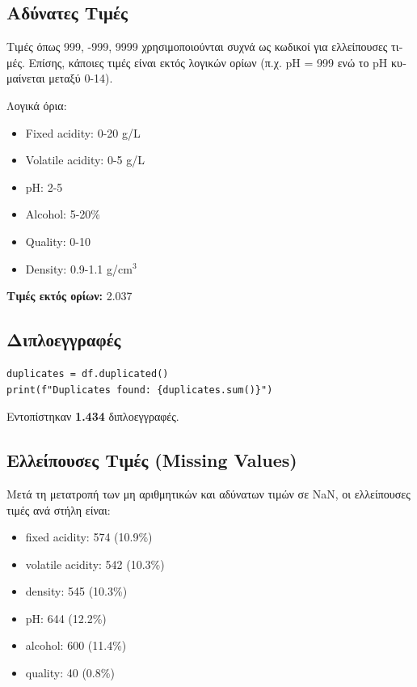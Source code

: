 \documentclass[12pt,a4paper]{article}
\begin{document}
\subsection{\textgreek{Αδύνατες Τιμές}}

\textgreek{Τιμές όπως 999, -999, 9999 χρησιμοποιούνται συχνά ως κωδικοί για ελλείπουσες τιμές. Επίσης, κάποιες τιμές είναι εκτός λογικών ορίων (π.χ. pH = 999 ενώ το pH κυμαίνεται μεταξύ 0-14).}

\textgreek{Λογικά όρια:}
\begin{itemize}
    \item Fixed acidity: 0-20 g/L
    \item Volatile acidity: 0-5 g/L
    \item pH: 2-5
    \item Alcohol: 5-20\%
    \item Quality: 0-10
    \item Density: 0.9-1.1 g/cm$^3$
\end{itemize}

\textbf{\textgreek{Τιμές εκτός ορίων:}} 2.037

\subsection{\textgreek{Διπλοεγγραφές}}

\begin{lstlisting}
duplicates = df.duplicated()
print(f"Duplicates found: {duplicates.sum()}")
\end{lstlisting}

\textgreek{Εντοπίστηκαν} \textbf{1.434} \textgreek{διπλοεγγραφές.}

\subsection{\textgreek{Ελλείπουσες Τιμές (Missing Values)}}

\textgreek{Μετά τη μετατροπή των μη αριθμητικών και αδύνατων τιμών σε NaN, οι ελλείπουσες τιμές ανά στήλη είναι:}

\begin{itemize}
    \item fixed acidity: 574 (10.9\%)
    \item volatile acidity: 542 (10.3\%)
    \item density: 545 (10.3\%)
    \item pH: 644 (12.2\%)
    \item alcohol: 600 (11.4\%)
    \item quality: 40 (0.8\%)
\end{itemize}
\end{document}
